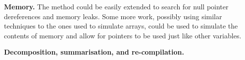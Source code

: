 \documentclass[12pt,a4paper]{article}
\begin{document}
\textbf{Memory.} The method could be easily extended to search for null pointer dereferences and memory leaks. Some more work, possibly using similar techniques to the ones used to simulate arrays, could be used to simulate the contents of memory and allow for pointers to be used just like other variables.

\textbf{Decomposition, summarisation, and re-compilation.}

\end{document}
